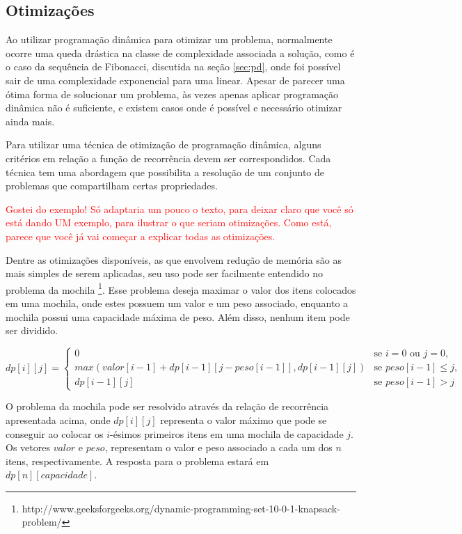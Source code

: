 \subsection{Otimizações}

Ao utilizar programação dinâmica para otimizar um problema, normalmente ocorre uma queda drástica na classe de complexidade associada a solução, como é o caso da sequência de Fibonacci, discutida na seção \ref{sec:pd}, onde foi possível sair de uma complexidade exponencial para uma linear. Apesar de parecer uma ótima forma de solucionar um problema, às vezes apenas aplicar programação dinâmica não é suficiente, e existem casos onde é possível e necessário otimizar ainda mais.

Para utilizar uma técnica de otimização de programação dinâmica, alguns critérios em relação a função de recorrência devem ser correspondidos. Cada técnica tem uma abordagem que possibilita a resolução de um conjunto de problemas que compartilham certas propriedades.

\textcolor{red}{Gostei do exemplo! Só adaptaria um pouco o texto, para deixar claro que você só está dando UM exemplo, para ilustrar o que seriam otimizações. Como está, parece que você já vai começar a explicar todas as otimizações.}

Dentre as otimizações disponíveis, as que envolvem redução de memória são as mais simples de serem aplicadas, seu uso pode ser facilmente entendido no problema da mochila \footnote{http://www.geeksforgeeks.org/dynamic-programming-set-10-0-1-knapsack-problem/}. Esse problema deseja maximar o valor dos itens colocados em uma mochila, onde estes possuem um valor e um peso associado, enquanto a mochila possui uma capacidade máxima de peso. Além disso, nenhum item pode ser dividido.  

\begin{equation}
dp[i][j] = 
\begin{cases}
0 &\text{se } i = 0 \text{ ou } j = 0,\\
max(valor[i-1] + dp[i-1][j-peso[i-1]], dp[i-1][j]) &\text{se } peso[i-1] \leq{j},\\
dp[i-1][j] &\text{se } peso[i-1] > j
\end{cases}
\label{eq:knapsack}
\end{equation}

O problema da mochila pode ser resolvido através da relação de recorrência apresentada acima, onde $dp[i][j]$ representa o valor máximo que pode se conseguir ao colocar os $i$-ésimos primeiros itens em uma mochila de capacidade $j$. Os vetores $valor$ e $peso$, representam o valor e peso associado a cada um dos $n$ itens, respectivamente. A resposta para o problema estará em $dp[n][capacidade]$.
 
